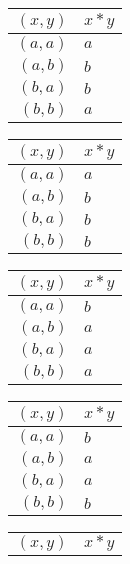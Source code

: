 \begin{enumerate}[label={\Alph*.},font={\bfseries}]
\begin{enumerate}[label={\arabic*},font={\bfseries}]
    \begin{minipage}[h]{.25\textwidth}
      \begin{tabular}{ r | l }
        $(x,y)$ & $x*y$ \\
        \hline
        $(a,a)$ & $a$ \\
        $(a,b)$ & $b$ \\
        $(b,a)$ & $b$ \\
        $(b,b)$ & $a$
      \end{tabular}
    \end{minipage}
    \begin{minipage}[h]{.25\textwidth}
      \begin{tabular}{ r | l }
        $(x,y)$ & $x*y$ \\
        \hline
        $(a,a)$ & $a$ \\
        $(a,b)$ & $b$ \\
        $(b,a)$ & $b$ \\
        $(b,b)$ & $b$
      \end{tabular}
    \end{minipage}
    \begin{minipage}[h]{.25\textwidth}
      \begin{tabular}{ r | l }
        $(x,y)$ & $x*y$ \\
        \hline
        $(a,a)$ & $b$ \\
        $(a,b)$ & $a$ \\
        $(b,a)$ & $a$ \\
        $(b,b)$ & $a$
      \end{tabular}
    \end{minipage}
    \begin{minipage}[h]{.25\textwidth}
      \begin{tabular}{ r | l }
        $(x,y)$ & $x*y$ \\
        \hline
        $(a,a)$ & $b$ \\
        $(a,b)$ & $a$ \\
        $(b,a)$ & $a$ \\
        $(b,b)$ & $b$
      \end{tabular}
    \end{minipage}
    \begin{minipage}[h]{.25\textwidth}
      \begin{tabular}{ r | l }
        $(x,y)$ & $x*y$ \\

\end{tabular}
\end{minipage}
\end{enumerate}
\end{enumerate}
